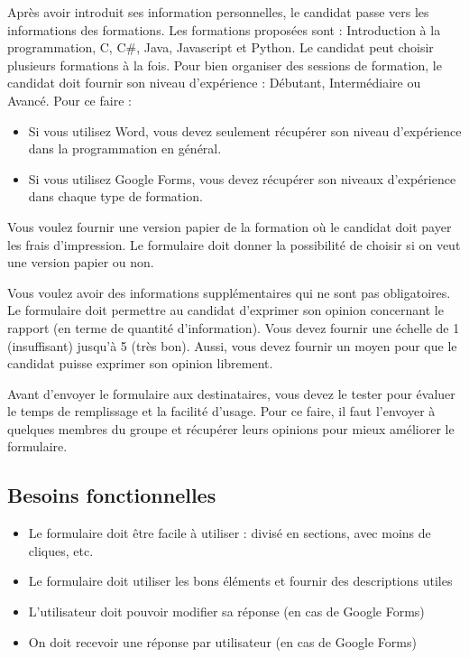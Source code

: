 \documentclass[11pt, a4paper]{article}
\begin{document}
Après avoir introduit ses information personnelles, le candidat passe vers les informations des formations. 
Les formations proposées sont : Introduction à la programmation, C, C\#, Java, Javascript et Python. 
Le candidat peut choisir plusieurs formations à la fois.
Pour bien organiser des sessions de formation, le candidat doit fournir son niveau d'expérience : Débutant, Intermédiaire ou Avancé. 
Pour ce faire : 
\begin{itemize}
	\item Si vous utilisez Word, vous devez seulement récupérer son niveau d'expérience dans la programmation en général.
	\item Si vous utilisez Google Forms, vous devez récupérer son niveaux d'expérience dans chaque type de formation.
\end{itemize}
Vous voulez fournir une version papier de la formation où le candidat doit payer les frais d'impression. 
Le formulaire doit donner la possibilité de choisir si on veut une version papier ou non.

Vous voulez avoir des informations supplémentaires qui ne sont pas obligatoires. 
Le formulaire doit permettre au candidat d'exprimer son opinion concernant le rapport (en terme de quantité d'information). 
Vous devez fournir une échelle de 1 (insuffisant) jusqu'à 5 (très bon). 
Aussi, vous devez fournir un moyen pour que le candidat puisse exprimer son opinion librement. 

Avant d'envoyer le formulaire aux destinataires, vous devez le tester pour évaluer le temps de remplissage et la facilité d'usage. 
Pour ce faire, il faut l'envoyer à quelques membres du groupe et récupérer leurs opinions pour mieux améliorer le formulaire. 

\subsection*{Besoins fonctionnelles}

\begin{multicols}{2}
\begin{itemize}
	\item Le formulaire doit être facile à utiliser : divisé en sections, avec moins de cliques, etc. 
	\item Le formulaire doit utiliser les bons éléments et fournir des descriptions utiles
	\item L'utilisateur doit pouvoir modifier sa réponse (en cas de Google Forms)
	\item On doit recevoir une réponse par utilisateur (en cas de Google Forms)
\end{itemize}
\end{multicols}
\end{document}
